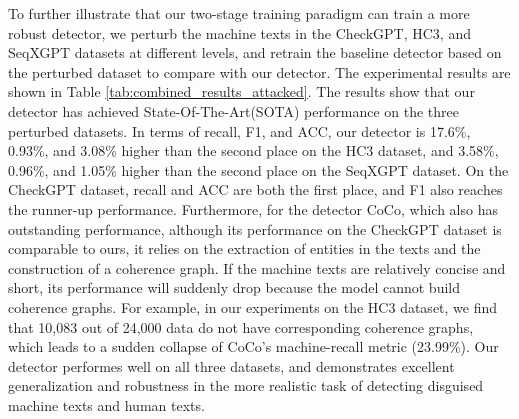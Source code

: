 \documentclass[11pt]{article}
\begin{document}
			To further illustrate that our two-stage training paradigm can train a more robust detector, we perturb the machine texts in the CheckGPT, HC3, and SeqXGPT datasets at different levels, and retrain the baseline detector based on the perturbed dataset to compare with our detector. The experimental results are shown in Table \ref{tab:combined_results_attacked}. The results show that our detector has achieved State-Of-The-Art(SOTA) performance on the three perturbed datasets. In terms of recall, F1, and ACC, our detector is 17.6\%, 0.93\%, and 3.08\% higher than the second place on the HC3 dataset, and 3.58\%, 0.96\%, and 1.05\% higher than the second place on the SeqXGPT dataset. On the CheckGPT dataset, recall and ACC are both the first place, and F1 also reaches the runner-up performance. Furthermore, for the detector CoCo, which also has outstanding performance, although its performance on the CheckGPT dataset is comparable to ours, it relies on the extraction of entities in the texts and the construction of a coherence graph. If the machine texts are relatively concise and short, its performance will suddenly drop because the model cannot build coherence graphs. For example, in our experiments on the HC3 dataset, we find that 10,083 out of 24,000 data do not have corresponding coherence graphs, which leads to a sudden collapse of CoCo's machine-recall metric (23.99\%). Our detector performes well on all three datasets, and demonstrates excellent generalization and robustness in the more realistic task of detecting disguised machine texts and human texts.
\end{document}
